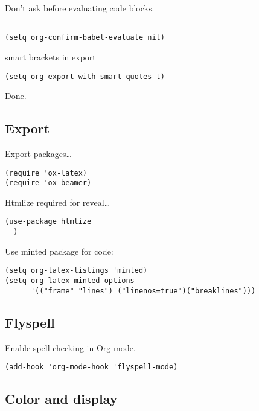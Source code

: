 \documentclass[12pt]{article}
\begin{document}
Don’t ask before evaluating code blocks.
\begin{verbatim}

(setq org-confirm-babel-evaluate nil)

\end{verbatim}

smart brackets in export

\begin{verbatim}
(setq org-export-with-smart-quotes t)
\end{verbatim}

Done.
\subsection{Export}
\label{sec:orgec5594b}

Export packages\ldots{}

\begin{verbatim}
(require 'ox-latex)
(require 'ox-beamer)
\end{verbatim}

Htmlize required for reveal\ldots{}

\begin{verbatim}
(use-package htmlize
  )
\end{verbatim}

Use minted package for code:

\begin{verbatim}
(setq org-latex-listings 'minted)
(setq org-latex-minted-options
      '(("frame" "lines") ("linenos=true")("breaklines")))
\end{verbatim}

\subsection{Flyspell}
\label{sec:orgdbc3fd3}
Enable spell-checking in Org-mode.
\begin{verbatim}
(add-hook 'org-mode-hook 'flyspell-mode)
\end{verbatim}

\subsection{Color and display}
\label{sec:orgb6015ef}
\end{document}
